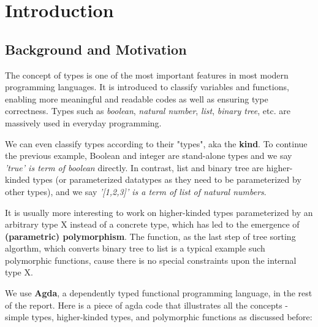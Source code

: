 \chapter{Introduction}

\section{Background and Motivation}

The concept of types is one of the most important features in most modern programming languages. It is introduced to classify variables and functions, enabling more meaningful and readable codes as well as ensuring type correctness. Types such as \textit{boolean}, \textit{natural number}, \textit{list}, \textit{binary tree}, etc. are massively used in everyday programming.

We can even classify types according to their "types", aka the \textbf{kind}. To continue the previous example, Boolean and integer are stand-alone types and we say \textit{'true' is term of boolean} directly. In contrast, list and binary tree are higher-kinded types (or parameterized datatypes as they need to be parameterized by other types), and we say \textit{'[1,2,3]' is a term of list of natural numbers}.

It is usually more interesting to work on higher-kinded types parameterized by an arbitrary type X instead of a concrete type, which has led to the emergence of \textbf{(parametric) polymorphism}. The  function, as the last step of tree sorting algorthm, which converts binary tree to list is a typical example such polymorphic functions, cause there is no special constraints upon the internal type X.

We use \textbf{Agda}, a dependently typed functional programming language, in the rest of the report. Here is a piece of agda code that illustrates all the concepts - simple types, higher-kinded types, and polymorphic functions as discussed before:

